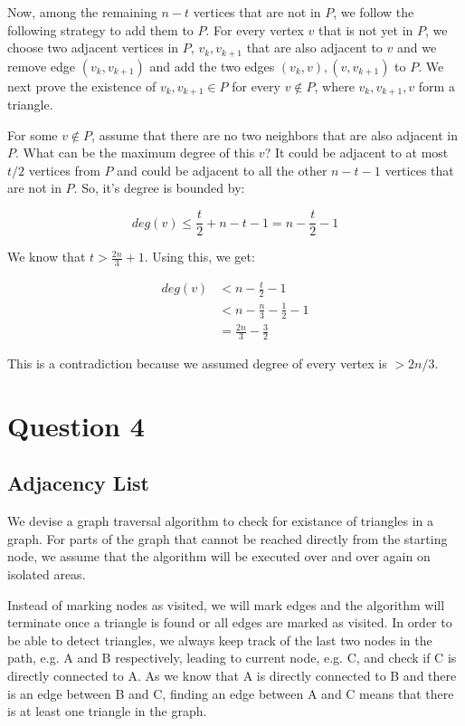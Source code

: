 \documentclass[a4paper]{article}
\begin{document}
Now, among the remaining $n-t$ vertices that are not in $P$, we follow the following strategy to add them to $P$. For every vertex $v$ that is not yet in $P$, we choose two adjacent vertices in $P$, $v_k, v_{k+1}$ that are also adjacent to $v$ and we remove edge $(v_k, v_{k+1})$ and add the two edges $(v_k, v), (v, v_{k+1})$ to $P$. We next prove the existence of $v_k, v_{k+1} \in P$ for every $v \notin P$, where $v_k, v_{k+1}, v$ form a triangle.

For some $v \notin P$, assume that there are no two neighbors that are also adjacent in $P$. What can be the maximum degree of this $v$? It could be adjacent to at most $t/2$ vertices from $P$ and could be adjacent to all the other $n-t-1$ vertices that are not in $P$. So, it's degree is bounded by:

\begin{equation*}
deg(v) \leq \frac{t}{2} + n-t-1 = n - \frac{t}{2} -1
\end{equation*}

We know that $t>\frac{2n}{3} + 1$. Using this, we get:

\begin{align*}
deg(v) & < n - \frac{t}{2} -1 \\
& < n - \frac{n}{3} - \frac12 - 1\\
& =\frac{2n}{3} - \frac{3}{2}
\end{align*}

This is a contradiction because we assumed degree of every vertex is $>2n/3$.

\section*{Question 4}
\subsection*{Adjacency List}
We devise a graph traversal algorithm to check for existance of triangles in a graph. For parts of the graph that cannot be reached directly from the starting node, we assume that the algorithm will be executed over and over again on isolated areas.

Instead of marking nodes as visited, we will mark edges and the algorithm will terminate once a triangle is found or all edges are marked as visited. In order to be able to detect triangles, we always keep track of the last two nodes in the path, e.g. A and B respectively, leading to current node, e.g. C, and check if C is directly connected to A. As we know that A is directly connected to B and there is an edge between B and C, finding an edge between A and C means that there is at least one triangle in the graph.
\end{document}
